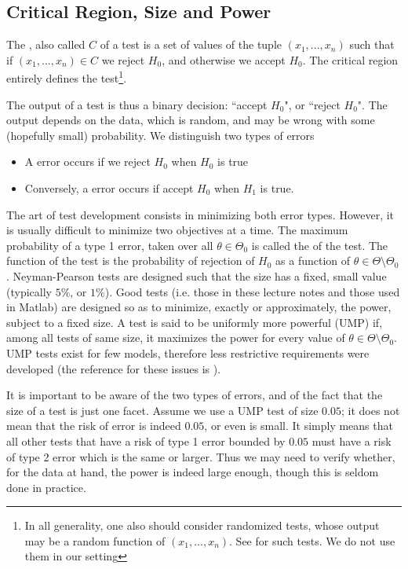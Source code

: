 \subsection{Critical Region, Size and Power}
The , also called  $C$
of a test is a set of values of the tuple $(x_1,...,x_n)$ such
that if $(x_1,...,x_n)\in C$ we reject $H_0$, and otherwise we
accept $H_0$. The critical region entirely defines the
test\footnote{In all generality, one also should consider
randomized tests, whose output may be a random function of
$(x_1,...,x_n)$. See \cite{poor1994isd} for such tests. We do
not use them in our setting}.

The output of a test is thus a binary decision: ``accept
$H_0$", or ``reject $H_0$". The output depends on the data,
which is random, and may be wrong with some (hopefully small)
probability. We distinguish two types of errors
\begin{itemize}
    \item A  error occurs if we reject $H_0$
        when $H_0$ is true
    \item Conversely, a  error occurs if accept
        $H_0$ when $H_1$ is true.
\end{itemize}

The art of test development consists in minimizing both error
types. However, it is usually difficult to minimize two
objectives at a time. The maximum probability of a type 1
error, taken over all $\theta \in \Theta_0$ is called the
 of the test. The  function of the test is
the probability of rejection of $H_0$ as a function of $\theta
\in \Theta \setminus \Theta_0 $. Neyman-Pearson tests are
designed such that the size has a fixed, small value (typically
$5\%$, or $1\%$). Good tests (i.e. those in these lecture notes
and those used in Matlab) are designed so as to minimize,
exactly or approximately, the power, subject to a fixed size. A
test is said to be uniformly more powerful (UMP) if, among all tests of same size, it
maximizes the power for every value of $\theta \in \Theta
\setminus \Theta_0$. UMP tests exist for few models, therefore
less restrictive requirements were developed (the reference for
these issues is \cite{lehmann2005tsh}).

It is important to be aware of the two types of errors, and of
the fact that the size of a test is just one facet. Assume we
use a UMP test of size $0.05$; it does not mean that the risk
of error is indeed $0.05$, or even is small. It simply means
that all other tests that have a risk of type 1 error bounded
by $0.05$ must have a risk of  type 2 error which is the same
or larger. Thus we may need to verify whether, for the data at
hand, the power is indeed large enough, though this is seldom
done in practice.

